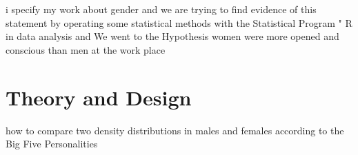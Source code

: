 i specify my work about gender and we are trying to find evidence of this statement by operating some statistical methods with the Statistical Program " R in data analysis and We went to the Hypothesis women were more opened and conscious  than men at the work place
 
 
 

   

\section{Theory and Design}
how to compare two density distributions in males and females according to the Big Five Personalities
